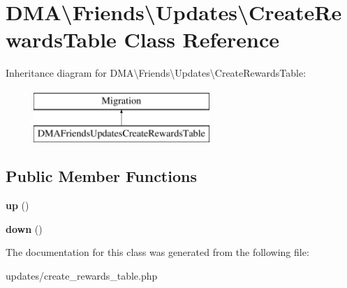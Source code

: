\hypertarget{classDMA_1_1Friends_1_1Updates_1_1CreateRewardsTable}{\section{D\-M\-A\textbackslash{}Friends\textbackslash{}Updates\textbackslash{}Create\-Rewards\-Table Class Reference}
\label{classDMA_1_1Friends_1_1Updates_1_1CreateRewardsTable}
}
Inheritance diagram for D\-M\-A\textbackslash{}Friends\textbackslash{}Updates\textbackslash{}Create\-Rewards\-Table\-:\begin{figure}[H]
\begin{center}
\leavevmode
\includegraphics[height=2.000000cm]{d1/d09/classDMA_1_1Friends_1_1Updates_1_1CreateRewardsTable}
\end{center}
\end{figure}
\subsection*{Public Member Functions}
\begin{DoxyCompactItemize}
\item 
\hypertarget{classDMA_1_1Friends_1_1Updates_1_1CreateRewardsTable_a29217659c5c6840561a4b792ea4fbdd0}{{\bfseries up} ()}\label{classDMA_1_1Friends_1_1Updates_1_1CreateRewardsTable_a29217659c5c6840561a4b792ea4fbdd0}

\item 
\hypertarget{classDMA_1_1Friends_1_1Updates_1_1CreateRewardsTable_a844d4be60eea493e17e96dc8efc4cba9}{{\bfseries down} ()}\label{classDMA_1_1Friends_1_1Updates_1_1CreateRewardsTable_a844d4be60eea493e17e96dc8efc4cba9}

\end{DoxyCompactItemize}


The documentation for this class was generated from the following file\-:\begin{DoxyCompactItemize}
\item 
updates/create\-\_\-rewards\-\_\-table.\-php\end{DoxyCompactItemize}
